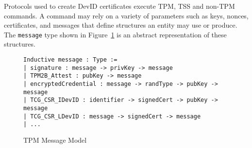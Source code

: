 \documentclass[runningheads]{llncs}
\begin{document}



Protocols used to create DevID certificates execute TPM, TSS and
non-TPM commands. A command may rely on a variety of parameters such
as keys, nonces, certificates, and messages that define structures an
entity may use or produce. The \verb|message| type shown in
Figure~\ref{fig:message-model} is an abstract representation of these
structures.

\begin{figure}[hbtp]
\vspace{-\medskipamount}
\vspace{-\medskipamount}

\begin{lstlisting}[language=Coq]
Inductive message : Type :=
| signature : message -> privKey -> message
| TPM2B_Attest : pubKey -> message
| encryptedCredential : message -> randType -> pubKey -> message
| TCG_CSR_IDevID : identifier -> signedCert -> pubKey -> message
| TCG_CSR_LDevID : message -> signedCert -> message 
| ...
\end{lstlisting}
\vspace{-\medskipamount}
\caption{TPM Message Model}
\label{fig:message-model}
\end{figure}

\end{document}
